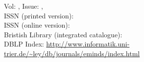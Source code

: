 

\noindent Vol: \emindsVolumeCount, Issue: \emindsVolumeNumber, \emindsVolumeDate \\
\noindent ISSN (printed version): \emindsISSNprinted \\
\noindent ISSN (online version): \emindsISSNonline \\
\noindent Bristish Library (integrated catalogue): \emindsBritishLibrary \\
\noindent DBLP Index: \url{http://www.informatik.uni-trier.de/~ley/db/journals/eminds/index.html}\\








{\footnotesize

}

